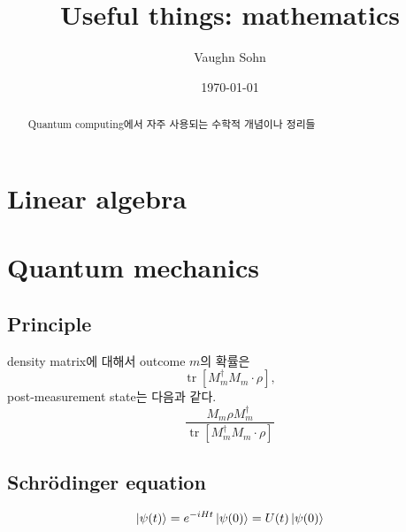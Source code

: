 \documentclass[
]{kaohandt}
\begin{document}

\title[Term paper]{Useful things: mathematics}
\author[SV]{Vaughn Sohn}
\date{\today}


\maketitle

\margintoc

\begin{abstract}
\noindent
Quantum computing에서 자주 사용되는 수학적 개념이나 정리들
\end{abstract}


\medskip


\section{Linear algebra}


\section{Quantum mechanics}
\subsection{Principle}
\begin{definition}
    density matrix에 대해서 outcome $m$의 확률은
    $$\operatorname{tr}\left[M_m^{\dagger} M_m \cdot \rho\right],$$
    post-measurement state는 다음과 같다.
    $$\frac{M_m \rho M_m^{\dagger}}{\operatorname{tr}\left[M_m^{\dagger} M_m \cdot \rho\right]}$$
\end{definition}

\subsection{Schrödinger equation}
\begin{theorem}
    $$\ket{\psi(t)} = e^{-iHt} \ket{\psi(0)} = U(t) \ket{\psi(0)}$$
\end{theorem}
\end{document}
